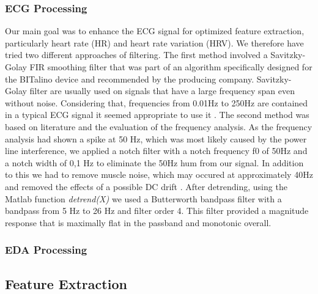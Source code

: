 \subsubsection{ECG Processing}
Our main goal was to enhance the ECG signal for optimized feature extraction, particularly heart rate (HR) and heart rate variation (HRV). We therefore have tried two different approaches of filtering. The first method involved a Savitzky-Golay FIR smoothing filter that was part of an algorithm specifically designed for the BITalino device and recommended by the producing company. Savitzky-Golay filter are usually used on signals that have a large frequency span even without noise. Considering that, frequencies from 0.01Hz to 250Hz are contained in a typical ECG signal it seemed appropriate to use it \cite{tan2013digital}.
The second method was based on literature and the evaluation of the frequency analysis.
As the frequency analysis had shown a spike at 50 Hz, which was most likely caused by the power line interference, we applied a notch filter with a notch frequency f0 of 50Hz and a notch width of 0,1 Hz to eliminate the 50Hz hum from our signal.
In addition to this we had to remove muscle noise, which may occured at approximately 40Hz and removed the effects of a possible DC drift \cite{tan2013digital}.
After detrending, using the Matlab function \textit{detrend(X)} we used a Butterworth bandpass filter with a bandpass from 5 Hz to 26 Hz and filter order 4. This filter provided a magnitude response that is maximally flat in the passband and monotonic overall.  

\subsubsection{EDA Processing}





\subsection{Feature Extraction}


%
%
%

